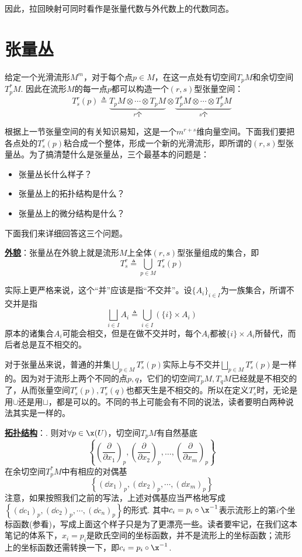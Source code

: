 因此，拉回映射可同时看作是张量代数与外代数上的代数同态。


\section{张量丛}\label{张量丛}

给定一个光滑流形$M^{m}$，对于每个点$p\in M$，在这一点处有切空间$T_{p}M$和余切空间$T^{\ast}_{p}M$. 因此在流形$M$的每一点$p$都可以构造一个$(r,s)$型张量空间：
\[
T^{r}_{s}(p)\triangleq \underbrace{T_{p}M\otimes \cdots\otimes T_{p}M}_{r\text{个}}\otimes \underbrace{T^{\ast}_{p}M\otimes\cdots\otimes T^{\ast}_{p}M}_{s\text{个}}
\]

根据上一节张量空间的有关知识易知，这是一个$m^{r+s}$维向量空间。下面我们要把各点处的$T^{r}_{s}(p)$粘合成一个整体，形成一个新的光滑流形，即所谓的$(r,s)$型张量丛。为了搞清楚什么是张量丛，三个最基本的问题是：
\begin{itemize}
	\item[(1)] 张量丛长什么样子？
	\item[(2)] 张量丛上的拓扑结构是什么？
	\item[(3)] 张量丛上的微分结构是什么？
\end{itemize}
下面我们来详细回答这三个问题。

\textbf{\underline{外貌}}：张量丛在外貌上就是流形$M$上全体$(r,s)$型张量组成的集合，即
		\[
		T^{r}_{s}\triangleq \bigcup\limits_{p\in M}T^{r}_{s}(p)
		\]

实际上更严格来说，这个“并”应该是指“不交并”。设$\{A_{i} \}_{i\in I}$为一族集合，所谓不交并是指
\[
\bigsqcup_{i \in I} A_{i}\triangleq\bigcup_{i \in I}\left(\{i\} \times A_{i}\right)
\]
原本的诸集合$A_{i}$可能会相交，但是在做不交并时，每个$A_{i}$都被$\{i\} \times A_{i}$所替代，而后者总是互不相交的。

对于张量丛来说，普通的并集$\bigcup\limits_{p\in M}T^{r}_{s}(p)$实际上与不交并$\bigsqcup\limits_{p\in M}T^{r}_{s}(p)$是一样的。因为对于流形上两个不同的点$p,q$，它们的切空间$T_{p}M,T_{q}M$已经就是不相交的了，从而张量空间$T^{r}_{s}(p),T^{r}_{s}(q)$也都天生是不相交的。所以在定义$T^{r}_{s}$时，无论是用$\cup$还是用$\sqcup$，都是可以的。不同的书上可能会有不同的说法，读者要明白两种说法其实是一样的。

\textbf{\underline{拓扑结构}}：{}. 则对$\forall p\in \x(U)$，切空间$T_{p}M$有自然基底
\[
\left\{ \left( \frac { \partial } { \partial x _ { 1 } } \right) _ { p },\left( \frac { \partial } { \partial x _ { 2 } } \right) _ { p } , \dots , \left( \frac { \partial } { \partial x _ { m } } \right) _ { p } \right\}
\]
在余切空间$T^{\ast}_{p}M$中有相应的对偶基
\[
\left\{(\dd x_{1})_{p},(\dd x_{2})_{p},\cdots,(\dd x_{m})_{p} \right\}
\]
注意，如果按照我们之前的写法，上述对偶基应当严格地写成$\left\{(\dd c_{1})_{p},(\dd c_{2})_{p},\cdots,(\dd c_{n})_{p} \right\}$的形式. 其中$c_{i}=p_{i}\circ\x^{-1}$表示流形上的第$i$个坐标函数(参看)，写成上面这个样子只是为了更漂亮一些。读者要牢记，在我们这本笔记的体系下，$x_{i}=p_{i}$是欧氏空间的坐标函数，并不是流形上的坐标函数；流形上的坐标函数还需转换一下，即$c_{i}=p_{i}\circ\x^{-1}$. 

